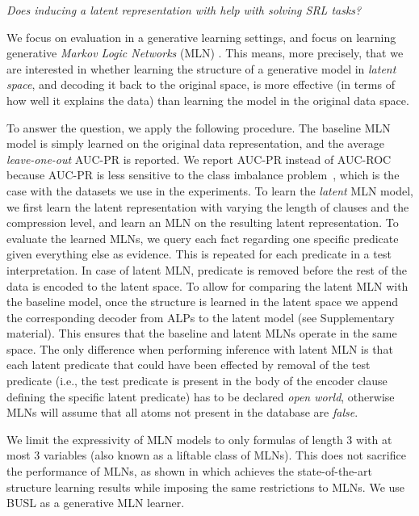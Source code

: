 \begin{displayquote}
\textit{Does inducing a latent  representation with  help with solving SRL tasks?}
\end{displayquote}

We focus on evaluation in a generative learning settings, and focus on learning generative \textit{Markov Logic Networks} (MLN) \cite{Richardson2006}.
This means, more precisely, that we are interested in whether learning the structure of a generative model in \textit{latent space}, and decoding it back to the original space, is more effective (in terms of how well it explains the data) than learning the model in the original data space.


To answer the question, we apply the following procedure.
The baseline MLN model is simply learned on the original data representation, and the average \textit{leave-one-out} AUC-PR is reported.
We report AUC-PR instead of AUC-ROC because AUC-PR is less sensitive to the class imbalance problem~\cite{Davis:2006:RPR:1143844.1143874}, which is the case with the datasets we use in the experiments.
To learn the \textit{latent} MLN model, we first learn the latent representation with  varying the length of clauses and the compression level, and learn an MLN on the resulting latent representation.
To evaluate the learned MLNs, we query each fact regarding one specific predicate given everything else as evidence.
This is repeated for each predicate in a test interpretation.
In case of latent MLN, predicate is removed before the rest of the data is encoded to the latent space.
To allow for comparing the latent MLN with the baseline model, once the structure is learned in the latent space we append the corresponding decoder from ALPs to the latent model (see Supplementary material).
This ensures that the baseline and latent MLNs operate in the same space.
The only difference when performing inference with latent MLN is that each latent predicate that could have been effected by removal of the test predicate (i.e., the test predicate is present in the body of the encoder clause defining the specific latent predicate) has to be declared \textit{open world}, otherwise MLNs will assume that all atoms not present in the database are \textit{false}.


 We limit the expressivity of MLN models to only formulas of length 3 with at most 3 variables (also known as a liftable class of MLNs).
This does not sacrifice the performance of MLNs, as shown in \cite{VanHaaren2016} which achieves the state-of-the-art structure learning results while imposing the same restrictions to MLNs.
We use BUSL \cite{mihalkova:icml07} as a generative MLN learner.




